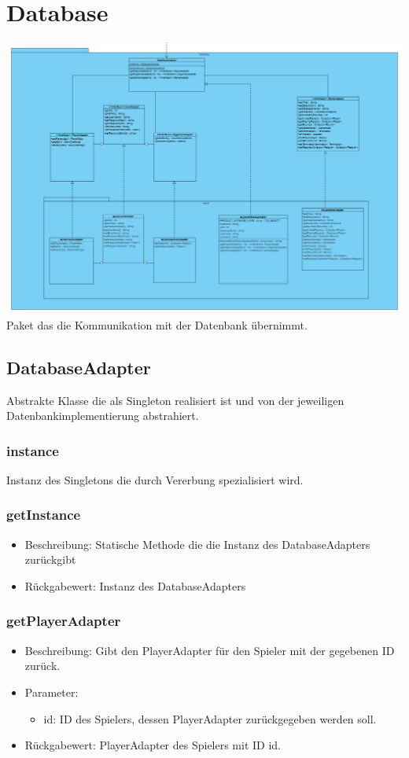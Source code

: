 \documentclass[a4paper]{scrreprt}
\begin{document}
    \section{Database}
    \includegraphics[width=\textwidth]{img/Database.PNG}
    Paket das die Kommunikation mit der Datenbank übernimmt.

    \subsection{DatabaseAdapter}
    Abstrakte Klasse die als Singleton realisiert ist und von der jeweiligen Datenbankimplementierung abstrahiert.

    \subsubsection{instance}
    Instanz des Singletons die durch Vererbung spezialisiert wird.

    \subsubsection{getInstance}
    \begin{itemize}
        \item Beschreibung: Statische Methode die die Instanz des DatabaseAdapters zurückgibt
        \item Rückgabewert: Instanz des DatabaseAdapters
    \end{itemize}

    \subsubsection{getPlayerAdapter}
    \begin{itemize}
        \item Beschreibung: Gibt den PlayerAdapter für den Spieler mit der gegebenen ID zurück.
        \item Parameter:
        \begin{itemize}
            \item id: ID des Spielers, dessen PlayerAdapter zurückgegeben werden soll.
        \end{itemize}
        \item Rückgabewert: PlayerAdapter des Spielers mit ID id.
    \end{itemize}
\end{document}
